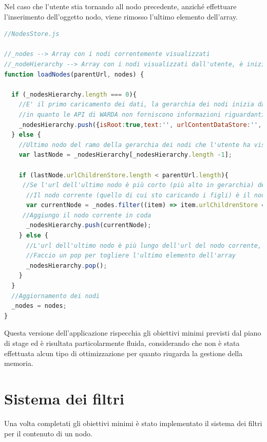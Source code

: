 Nel caso che l'utente stia tornando all nodo precedente, anziché effettuare l'inserimento dell'oggetto nodo, viene rimosso l'ultimo elemento dell'array. 

\begin{lstlisting}[language=JavaScript, caption=NodesStore - Caricamento dei nodi]
//NodesStore.js

//_nodes --> Array con i nodi correntemente visualizzati
//_nodeHierarchy --> Array con i nodi visualizzati dall'utente, è inizializzato come array vuoto
function loadNodes(parentUrl, nodes) {

  if (_nodesHierarchy.length === 0){
    //E' il primo caricamento dei dati, la gerarchia dei nodi inizia da un nodo "finto" che funziona da radice
    //in quanto le API di WARDA non forniscono informazioni riguardanti il nodo radice di una gallery
    _nodesHierarchy.push({isRoot:true,text:'', urlContentDataStore:'', urlChildrenStore:''});
  } else {
    //Ultimo nodo del ramo della gerarchia dei nodi che l'utente ha visualizzato
    var lastNode = _nodesHierarchy[_nodesHierarchy.length -1];

    if (lastNode.urlChildrenStore.length < parentUrl.length){
     //Se l'url dell'ultimo nodo è più corto (più alto in gerarchia) dell'url del nodo corrente, vuol dire che l'utente sta scendendo lungo il ramo
      //Il nodo corrente (quello di cui sto caricando i figli) è il nodo che ha urlContentDataStore == parentUrl e che si trova correntemente in memoria
      var currentNode = _nodes.filter((item) => item.urlChildrenStore === parentUrl)[0];
     //Aggiungo il nodo corrente in coda
      _nodesHierarchy.push(currentNode);
    } else {
      //L'url dell'ultimo nodo è più lungo dell'url del nodo corrente, vuol dire che sto risalendo lungo il ramo
      //Faccio un pop per togliere l'ultimo elemento dell'array
      _nodesHierarchy.pop();
    }
  }
  //Aggiornamento dei nodi
  _nodes = nodes;
}
\end{lstlisting}

Questa versione dell'applicazione rispecchia gli obiettivi minimi previsti dal piano di stage ed è risultata particolarmente fluida, considerando che non è stata effettuata alcun tipo di ottimizzazione per quanto riugarda la gestione della memoria.

\section{Sistema dei filtri}

Una volta completati gli obiettivi minimi è stato implementato il sistema dei filtri per il contenuto di un nodo.

